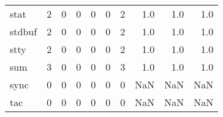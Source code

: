 \begin{longtable}{lrrrrrrrrr}
stat      &                                                  2 &                                                  0 &                                                  0 &                                                  0 &                                                  0 &                                                  2 &                                                1.0 &                                    1.0 &                                  1.0 \\
stdbuf    &                                                  2 &                                                  0 &                                                  0 &                                                  0 &                                                  0 &                                                  2 &                                                1.0 &                                    1.0 &                                  1.0 \\
stty      &                                                  2 &                                                  0 &                                                  0 &                                                  0 &                                                  0 &                                                  2 &                                                1.0 &                                    1.0 &                                  1.0 \\
sum       &                                                  3 &                                                  0 &                                                  0 &                                                  0 &                                                  0 &                                                  3 &                                                1.0 &                                    1.0 &                                  1.0 \\
sync      &                                                  0 &                                                  0 &                                                  0 &                                                  0 &                                                  0 &                                                  0 &                                                NaN &                                    NaN &                                  NaN \\
tac       &                                                  0 &                                                  0 &                                                  0 &                                                  0 &                                                  0 &                                                  0 &                                                NaN &                                    NaN &                                  NaN \\

\end{longtable}
